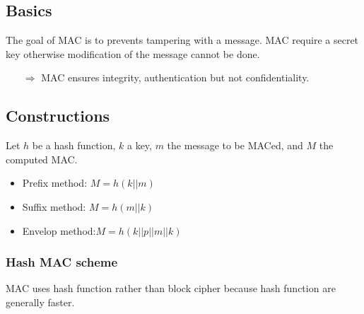 
\subsection{Basics}
The goal of MAC is to prevents tampering with a message. MAC require a secret
key otherwise modification of the message cannot be done. 
\begin{itemize}
    \item[$\Rightarrow$] MAC ensures integrity, authentication but not confidentiality.
\end{itemize}

\subsection{Constructions}
Let $h$ be a hash function, $k$ a key, $m$ the message to be MACed, and $M$ the
computed MAC.
\begin{itemize}
    \item Prefix method: $ M = h(k||m) $
    \item Suffix method: $ M = h(m||k) $
    \item Envelop method:$ M = h(k||p||m||k) $
\end{itemize}

\subsubsection{Hash MAC scheme}
MAC uses hash function rather than block cipher because hash function are
generally faster.

